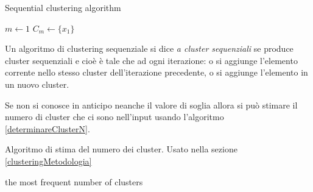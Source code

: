 \incmargin{1em}
\linesnumbered
\begin{algorithm}
  \dontprintsemicolon
  \SetVline
  \caption{Sequential clustering algorithm}
    \BlankLine
    $m\leftarrow 1$\;
    $C_{m}\leftarrow \{x_{1}\}$\;
\label{clusteringSequenzialeAlgoritmo}
\end{algorithm}
\decmargin{1em}

Un algoritmo di clustering sequenziale si dice \emph{a cluster sequenziali} se produce cluster sequenziali e cio\`e \`e tale che ad ogni iterazione: o si aggiunge l'elemento corrente nello stesso cluster dell'iterazione precedente, o si aggiunge l'elemento in un nuovo cluster.

Se non si conosce in anticipo neanche il valore di soglia allora si pu\`o stimare il numero di cluster che ci sono nell'input usando l'algoritmo \ref{determinareClusterN}. 

\incmargin{1em}
\linesnumbered
\begin{algorithm}
  \dontprintsemicolon
  \SetVline
  \caption{Algoritmo di stima del numero dei cluster. Usato nella sezione \ref{clusteringMetodologia}}
    \BlankLine
    \Return the most frequent number of clusters\;
\label{determinareClusterN}
\end{algorithm}
\decmargin{1em}



